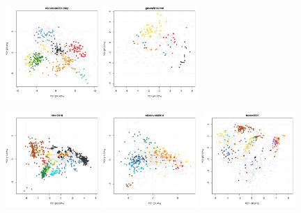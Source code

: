 \documentclass[12pt]{article}\usepackage[]{graphicx}\usepackage[]{color}
\begin{document}
\begin{appendices}
\begin{figure}[htb]
  \includegraphics[width = 0.32\textwidth]{./figure/figpca-23.pdf}
  \includegraphics[width = 0.32\textwidth]{./figure/figpca-24.pdf}
\end{figure}
\begin{figure}[htb]
  \includegraphics[width = 0.32\textwidth]{./figure/figpca-25.pdf}
  \includegraphics[width = 0.32\textwidth]{./figure/figpca-26.pdf}
  \includegraphics[width = 0.32\textwidth]{./figure/figpca-27.pdf}

\end{figure}
\end{appendices}
\end{document}

